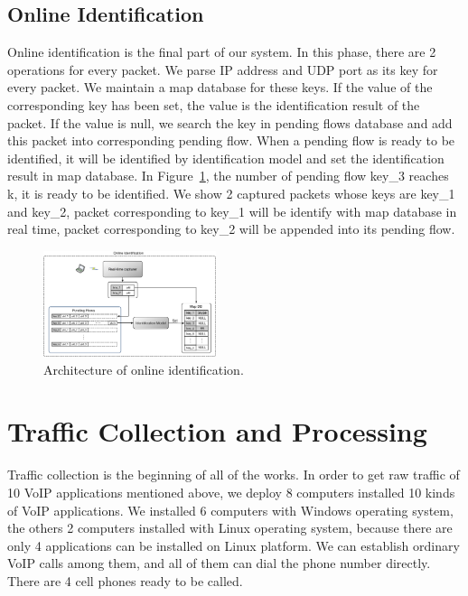 \documentclass[conference]{IEEEtran}
\begin{document}
\subsection{Online Identification}
Online identification is the final part of our system. In this phase, there are 2 operations for every packet. We parse IP address and UDP port as its key for every packet. We maintain a map database for these keys. If the value of the corresponding key has been set, the value is the identification result of the packet. If the value is null, we search the key in pending flows database and add this packet into corresponding pending flow. When a pending flow is ready to be identified, it will be identified by identification model and set the identification result in map database. In Figure~\ref{fig:online_architecture.eps}, the number of pending flow key\_3 reaches k, it is ready to be identified. We show 2 captured packets whose keys are key\_1 and key\_2, packet corresponding to key\_1 will be identify with map database in real time, packet corresponding to key\_2 will be appended into its pending flow.

\begin{figure}[htp]
\begin{center}
\includegraphics[width=0.45\textwidth]{online_architecture.eps}
\caption{Architecture of online identification.}\label{fig:online_architecture.eps}
\end{center}
\end{figure}

\section{Traffic Collection and Processing}
\label{sec:trafficcollectionandprocessing}
Traffic collection is the beginning of all of the works. In order to get raw traffic of 10 VoIP applications mentioned above, we deploy 8 computers installed 10 kinds of VoIP applications. We installed 6 computers with Windows operating system, the others 2 computers installed with Linux operating system, because there are only 4 applications can be installed on Linux platform. We can establish ordinary VoIP calls among them, and all of them can dial the phone number directly. There are 4 cell phones ready to be called.
\end{document}
